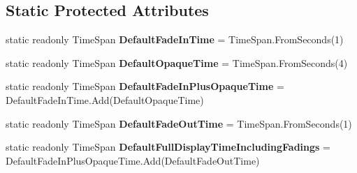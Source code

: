 \subsection*{Static Protected Attributes}
\begin{DoxyCompactItemize}
\item 
\hypertarget{class_cloud_api_public_1_1_event_message_receiver_1_1_event_message_a850fa0d780ed7cd25cee6fe7e597cd73}{static readonly Time\-Span {\bfseries Default\-Fade\-In\-Time} = Time\-Span.\-From\-Seconds(1)}\label{class_cloud_api_public_1_1_event_message_receiver_1_1_event_message_a850fa0d780ed7cd25cee6fe7e597cd73}

\item 
\hypertarget{class_cloud_api_public_1_1_event_message_receiver_1_1_event_message_a5cc935186c2a74135f99f19f424d879f}{static readonly Time\-Span {\bfseries Default\-Opaque\-Time} = Time\-Span.\-From\-Seconds(4)}\label{class_cloud_api_public_1_1_event_message_receiver_1_1_event_message_a5cc935186c2a74135f99f19f424d879f}

\item 
\hypertarget{class_cloud_api_public_1_1_event_message_receiver_1_1_event_message_aa47823b3cdf4ffac2e6f344aa4f9dd09}{static readonly Time\-Span {\bfseries Default\-Fade\-In\-Plus\-Opaque\-Time} = Default\-Fade\-In\-Time.\-Add(Default\-Opaque\-Time)}\label{class_cloud_api_public_1_1_event_message_receiver_1_1_event_message_aa47823b3cdf4ffac2e6f344aa4f9dd09}

\item 
\hypertarget{class_cloud_api_public_1_1_event_message_receiver_1_1_event_message_a0361ed6b766e494877a6f4f83fce8244}{static readonly Time\-Span {\bfseries Default\-Fade\-Out\-Time} = Time\-Span.\-From\-Seconds(1)}\label{class_cloud_api_public_1_1_event_message_receiver_1_1_event_message_a0361ed6b766e494877a6f4f83fce8244}

\item 
\hypertarget{class_cloud_api_public_1_1_event_message_receiver_1_1_event_message_a1119b58452996e6f3db9b083a5d94558}{static readonly Time\-Span {\bfseries Default\-Full\-Display\-Time\-Including\-Fadings} = Default\-Fade\-In\-Plus\-Opaque\-Time.\-Add(Default\-Fade\-Out\-Time)}\label{class_cloud_api_public_1_1_event_message_receiver_1_1_event_message_a1119b58452996e6f3db9b083a5d94558}

\end{DoxyCompactItemize}
